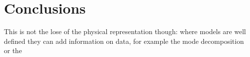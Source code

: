 \chapter{Conclusions}
\label{section:8_conclusions}


This is not the lose of the physical representation though: where models are well defined they can add information on data, for example the mode decomposition or the 
